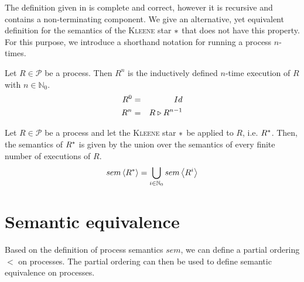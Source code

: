 The definition given in  is complete and correct, however it is recursive and contains a non-terminating component. We give an alternative, yet equivalent definition for the semantics of the \textsc{Kleene} star $*$ that does not have this property. For this purpose, we introduce a shorthand notation for running a process $n$-times.
\begin{definition}
\label{def:multiple_execution}
Let $R \in \mathcal{P}$ be a process. Then $R^n$ is the inductively defined $n$-time execution of $R$ with $n \in \mathbb{N}_0$.
  \begin{eqnarray}
    \label{eqn:multiple_execution}
    R^0 & = & Id \\
    R^n & = & R \triangleright R^{n-1} 
  \end{eqnarray}
  \hfill\qedsymbol
\end{definition}



\begin{definition}
\label{def:sem_kleene_alternative}
  Let $R \in \mathcal{P}$ be a process and let the \textsc{Kleene} star $*$ be applied to $R$, i.e. $R^*$. Then, the semantics of $R^*$ is given by the union over the semantics of every finite number of executions of $R$.
  \begin{equation}
    \label{eqn:sem_kleene_alternative}
    sem \left\langle R^* \right\rangle = \bigcup_{i \in \mathbb{N}_0} sem \left\langle R^i \right\rangle
  \end{equation}
  \hfill\qedsymbol
\end{definition}


\section{Semantic equivalence}
Based on the definition of process semantics $sem$, we can define a partial ordering $<$ on processes. The partial ordering can then be used to define semantic equivalence on processes.



